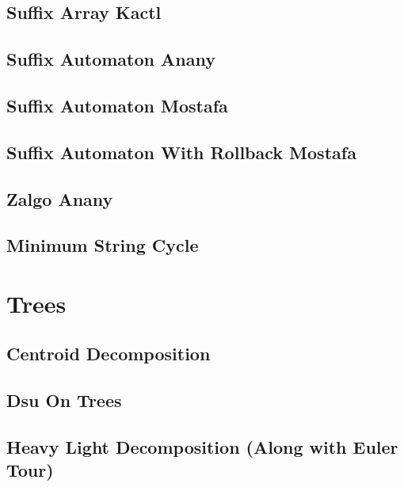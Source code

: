\subsection{Suffix Array Kactl}
\raggedbottom
\hrulefill
\subsection{Suffix Automaton Anany}
\raggedbottom
\hrulefill
\subsection{Suffix Automaton Mostafa}
\raggedbottom
\hrulefill
\subsection{Suffix Automaton With Rollback Mostafa}
\raggedbottom
\hrulefill
\subsection{Zalgo Anany}
\raggedbottom
\hrulefill
\subsection{Minimum String Cycle}
\raggedbottom
\hrulefill

\section{Trees}
\subsection{Centroid Decomposition}
\raggedbottom
\hrulefill
\subsection{Dsu On Trees}
\raggedbottom
\hrulefill
\subsection{Heavy Light Decomposition (Along with Euler Tour)}
\raggedbottom
\hrulefill
